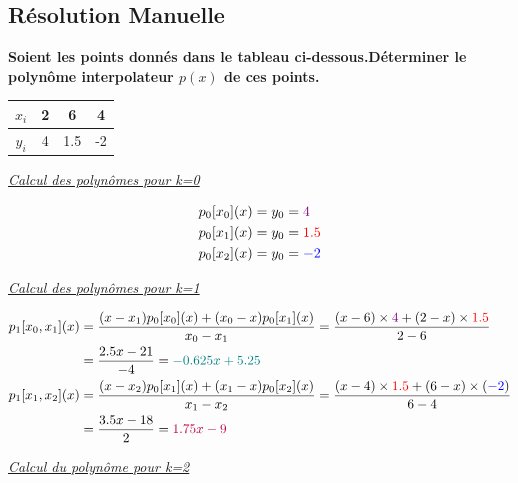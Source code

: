 \subsection{Résolution Manuelle}
\begin{center}
    \textbf{Soient les points donnés dans le tableau ci-dessous.Déterminer le polynôme interpolateur $p(x)$ de ces points.}\vspace{6pt}\\
\begin{tabular}{|c|c|c|c|}
    \hline
    $x_i$ & 2 & 6 & 4 \\
    \hline
    $y_i$ & 4 & 1.5 & -2\\
    \hline
\end{tabular}
\end{center}
\underline{\textit{Calcul des polynômes pour k=0}}\\
\begin{center}
    \begin{align*}
        p_0[x_0](x)&=y_0=\textcolor{violet}{4}\vspace{4pt}\\
        p_0[x_1](x)&=y_0=\textcolor{red}{1.5}\vspace{4pt}\\
        p_0[x_2](x)&=y_0=\textcolor{blue}{-2}\vspace{4pt}\\
    \end{align*}
\end{center}
\underline{\textit{Calcul des polynômes pour k=1}}\\
\begin{center}
    \begin{align*}
        p_1[x_0, x_1](x)&=\frac{(x-x_1)p_0[x_0](x)+(x_0-x)p_0[x_1](x)}{x_0-x_1}=\frac{(x-6)\times\textcolor{violet}{4}+(2-x)\times\textcolor{red}{1.5}}{2-6}\\&=\frac{2.5x-21}{-4}=\textcolor{teal}{-0.625x+5.25}\vspace{4pt}\\
        p_1[x_1, x_2](x)&=\frac{(x-x_2)p_0[x_1](x)+(x_1-x)p_0[x_2](x)}{x_1-x_2}=\frac{(x-4)\times \textcolor{red}{1.5}+(6-x)\times(\textcolor{blue}{-2})}{6-4}\\&=\frac{3.5x-18}{2}=\textcolor{purple}{1.75x-9}\vspace{4pt}\\
    \end{align*}
\end{center}
\underline{\textit{Calcul du polynôme pour k=2}}\\
